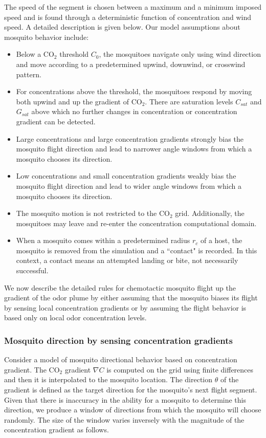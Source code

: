 \documentclass[12pt]{article}
\begin{document}
The speed of the segment is chosen between a maximum and a minimum
imposed speed and is found through a deterministic function of
concentration and wind speed. A detailed description is given
below. Our model assumptions about mosquito behavior include:
\begin{itemize}
\item
Below a CO$_2$ threshold $C_0$, the mosquitoes navigate only using wind direction and move according to a predetermined upwind, downwind, or crosswind pattern.
\item For concentrations above the threshold, the
    mosquitoes respond by moving both upwind and
   up the gradient of CO$_2$. There are saturation levels
    $C_{sat}$ and $G_{sat}$ above which no further changes
    in concentration or concentration gradient can be
    detected.
\item Large concentrations and large concentration
    gradients strongly bias the mosquito flight direction and lead to narrower angle windows from which a
    mosquito chooses its direction.
\item  Low concentrations and small concentration
    gradients weakly bias the mosquito flight direction and lead to wider angle windows from which a
    mosquito chooses its direction.
\item The mosquito motion is not restricted to the CO$_2$
    grid. Additionally, the mosquitoes may leave and re-enter the
    concentration computational domain.
\item When a mosquito
comes within a predetermined radius
    $r_c$ of a host, the mosquito is removed from the
    simulation and a ``contact" is recorded. In this
    context, a contact means an attempted landing or bite,
    not necessarily successful.
\end{itemize}
	
	
	We now describe the detailed rules for chemotactic mosquito flight up the gradient of the odor plume by either assuming that the mosquito biases its flight by sensing local concentration gradients or by assuming the flight behavior is based only on  local odor concentration levels.

\subsubsection{Mosquito direction by sensing concentration gradients}
Consider a model of mosquito directional behavior based on
concentration gradient.  The CO$_2$ gradient $\nabla C$ is computed on the
grid using finite differences and then it is interpolated to
the mosquito location.  The direction $\theta$ of the gradient
is defined as the target direction for the mosquito's next flight
segment. Given that there is inaccuracy in the ability for a
mosquito to determine this direction, we produce a window of
directions from which the mosquito will choose randomly.  The
size of the window varies inversely with the magnitude of the
concentration gradient as follows.
\end{document}
